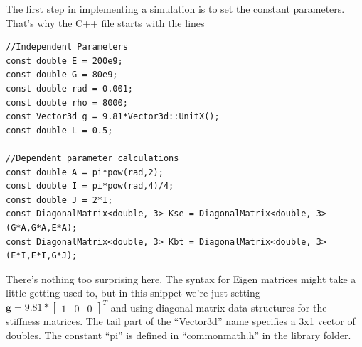 \documentclass[12pt]{article}
\begin{document}
The first step in implementing a simulation is to set the constant parameters. That's why the C++ file starts with the lines
\begin{lstlisting}
//Independent Parameters
const double E = 200e9;
const double G = 80e9;
const double rad = 0.001;
const double rho = 8000;
const Vector3d g = 9.81*Vector3d::UnitX();
const double L = 0.5;

//Dependent parameter calculations
const double A = pi*pow(rad,2);
const double I = pi*pow(rad,4)/4;
const double J = 2*I;
const DiagonalMatrix<double, 3> Kse = DiagonalMatrix<double, 3>(G*A,G*A,E*A);
const DiagonalMatrix<double, 3> Kbt = DiagonalMatrix<double, 3>(E*I,E*I,G*J);
\end{lstlisting}
There's nothing too surprising here. The syntax for Eigen matrices might take a little getting used to, but in this snippet we're just setting $\boldsymbol{g} = 9.81*\begin{bmatrix} 1 & 0 & 0 \end{bmatrix}^T$ and using diagonal matrix data structures for the stiffness matrices. The tail part of the ``Vector3d'' name specifies a 3x1 vector of doubles. The constant ``pi'' is defined in ``commonmath.h'' in the library folder.
\end{document}
